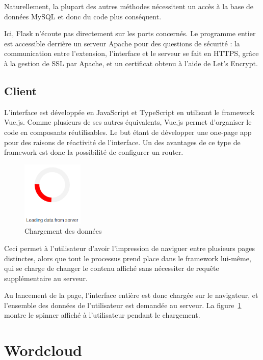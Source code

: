 		Naturellement, la plupart des autres méthodes nécessitent un accès à la base de données MySQL et donc du code plus conséquent.

		Ici, Flask n'écoute pas directement sur les ports concernés. Le programme entier est accessible derrière un serveur Apache pour des questions de sécurité : la communication entre l'extension, l'interface et le serveur se fait en HTTPS, grâce à la gestion de SSL par Apache, et un certificat obtenu à l'aide de Let's Encrypt.


	\subsection{Client}

		L'interface est développée en JavaScript et TypeScript en utilisant le framework Vue.js. Comme plusieurs de ses autres équivalents, Vue.js permet d'organiser le code en composants réutilisables. Le but étant de développer une one-page app pour des raisons de réactivité de l'interface. Un des avantages de ce type de framework est donc la possibilité de configurer un router.

		\begin{figure}
			\includegraphics[width=2.9cm]{images/design/loading_spinner}
			\caption{Chargement des données}\label{i-loading}
		\end{figure} 

		Ceci permet à l'utilisateur d'avoir l'impression de naviguer entre plusieurs pages distinctes, alors que tout le processus prend place dans le framework lui-même, qui se charge de changer le contenu affiché sans nécessiter de requête supplémentaire au serveur.

		Au lancement de la page, l'interface entière est donc chargée sur le navigateur, et l'ensemble des données de l'utilisateur est demandée au serveur. La figure~\ref{i-loading} montre le spinner affiché à l'utilisateur pendant le chargement.

%
%
%
%

\section{Wordcloud}

